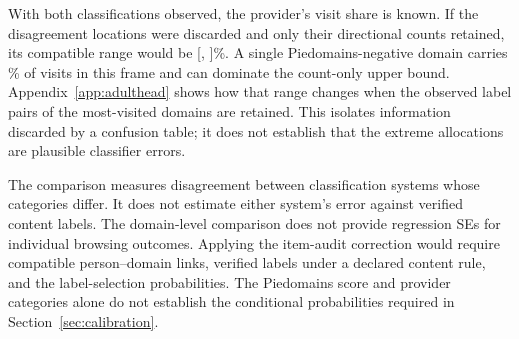 With both classifications observed, the provider's visit share is known. If
the disagreement locations were discarded and only their directional counts
retained, its compatible range would be
[\AdultFocalLower{}, \AdultFocalUpper{}]\%. A single Piedomains-negative
domain carries \AdultFocalLargest{}\% of visits in this frame and can dominate
the count-only upper bound. Appendix~\ref{app:adulthead} shows how that range
changes when the observed label pairs of the most-visited domains are retained.
This isolates information discarded by a confusion table; it does not
establish that the extreme allocations are plausible classifier errors.

The comparison measures disagreement between classification systems whose
categories differ. It does not estimate either system's error against
verified content labels. The domain-level comparison does not provide
regression SEs for individual browsing outcomes. Applying the item-audit
correction would require compatible person--domain links, verified labels
under a declared content rule, and the label-selection probabilities.
The Piedomains score and provider categories alone do not establish the
conditional probabilities required in Section~\ref{sec:calibration}.
